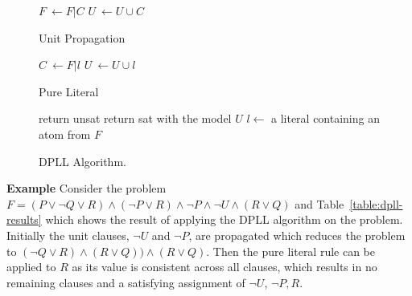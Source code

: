 \documentclass[]{final_report}
\begin{document}
\begin{figure}[t]
\begin{algorithmic}
		\State $\mathit{F}~\gets \mathit{F}|C$
		\State $U~\gets U \cup {C}$
	\EndWhile
\EndFunction    
\end{algorithmic}

\caption{\label{fig:dppl-unit-propagate} Unit Propagation}
\end{figure}

\begin{figure}[t]
\begin{algorithmic}
		\State $C~\gets \mathit{F}|l$
		\State $U~\gets U \cup {l}$
	\EndWhile
\EndFunction    
\end{algorithmic}

\caption{\label{fig:dppl-pure-literal} Pure Literal}
\end{figure}

\begin{figure}[t]
\begin{algorithmic}
	\State {}
		\State return unsat
	\EndIf
	\State {}
		\State return sat with the model $U$
	\EndIf
	\State $l \gets$ a literal containing an atom from $\mathit{F}$
	\State {}
	\State {}
\EndFunction    
\end{algorithmic}
\caption{\label{fig:dppl-classic-algo} DPLL Algorithm.}
\end{figure}

\textbf{Example}
Consider the problem $F = (P \lor \lnot{Q} \lor R) \land (\lnot{P} \lor R) \land \lnot{P} \land \lnot{U} \land (R \lor Q)$ and Table~\ref{table:dpll-results} which shows the result of applying the DPLL algorithm on the problem. Initially the unit clauses, $\lnot{U}$ and $\lnot{P}$, are propagated which reduces the problem to $(\lnot{Q} \lor R) \land (R \lor Q)) \land (R \lor Q)$. Then the pure literal rule can be applied to $R$ as its value is consistent across all clauses, which results in no remaining clauses and a satisfying assignment of $\lnot{U}$, $\lnot{P}, R$.
\end{document}
